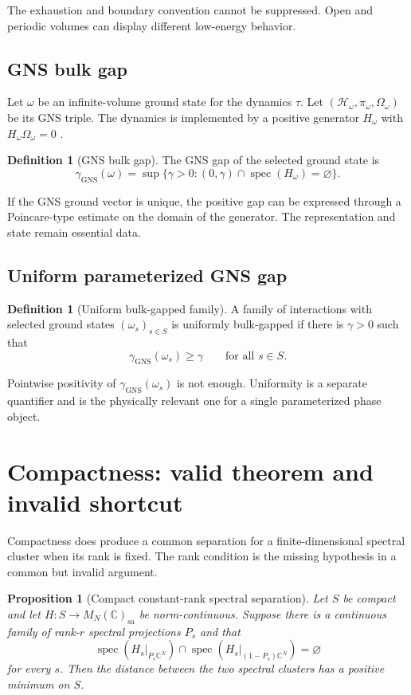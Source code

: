 \documentclass[12pt]{article}
\newtheorem{proposition}[theorem]{Proposition}
\theoremstyle{definition}
\newtheorem{definition}[theorem]{Definition}
\theoremstyle{remark}
\newcommand{\spec}{\operatorname{spec}}
\begin{document}
The exhaustion and boundary convention cannot be suppressed. Open and
periodic volumes can display different low-energy behavior.

\subsection{GNS bulk gap}

Let $\omega$ be an infinite-volume ground state for the dynamics $\tau$. Let
$(\mathcal H_\omega,\pi_\omega,\Omega_\omega)$ be its GNS triple. The dynamics
is implemented by a positive generator $H_\omega$ with
$H_\omega\Omega_\omega=0$ \cite{BratteliRobinson2}.

\begin{definition}[GNS bulk gap]
The GNS gap of the selected ground state is
\[
\gamma_{\mathrm{GNS}}(\omega)
=
\sup\{\gamma>0:(0,\gamma)\cap\spec(H_\omega)=\varnothing\}.
\]
\end{definition}

If the GNS ground vector is unique, the positive gap can be expressed through
a Poincare-type estimate on the domain of the generator. The representation
and state remain essential data.

\subsection{Uniform parameterized GNS gap}

\begin{definition}[Uniform bulk-gapped family]
A family of interactions with selected ground states $(\omega_s)_{s\in S}$ is
uniformly bulk-gapped if there is $\gamma>0$ such that
\[
\gamma_{\mathrm{GNS}}(\omega_s)\geq\gamma
\qquad
\text{for all }s\in S.
\]
\end{definition}

Pointwise positivity of $\gamma_{\mathrm{GNS}}(\omega_s)$ is not enough.
Uniformity is a separate quantifier and is the physically relevant one for a
single parameterized phase object.

\section{Compactness: valid theorem and invalid shortcut}

Compactness does produce a common separation for a finite-dimensional spectral
cluster when its rank is fixed. The rank condition is the missing hypothesis
in a common but invalid argument.

\begin{proposition}[Compact constant-rank spectral separation]
\label{prop:constant-rank}
Let $S$ be compact and let $H:S\to M_N(\mathbb C)_{\mathrm{sa}}$ be
norm-continuous. Suppose there is a continuous family of rank-$r$ spectral
projections $P_s$ and that
\[
\spec(H_s|_{P_s\mathbb C^N})
\cap
\spec(H_s|_{(1-P_s)\mathbb C^N})
=\varnothing
\]
for every $s$. Then the distance between the two spectral clusters has a
positive minimum on $S$.
\end{proposition}
\end{document}

